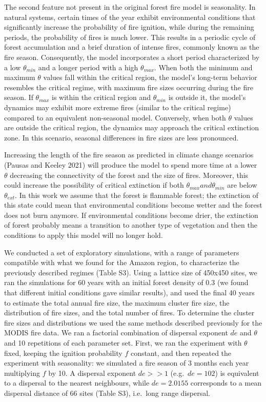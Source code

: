 \documentclass[
]{article}
\begin{document}
The second feature not present in the original forest fire model is
seasonality. In natural systems, certain times of the year exhibit
environmental conditions that significantly increase the probability of
fire ignition, while during the remaining periods, the probability of
fires is much lower. This results in a periodic cycle of forest
accumulation and a brief duration of intense fires, commonly known as
the fire season. Consequently, the model incorporates a short period
characterized by a low \(\theta_{min}\) and a longer period with a high
\(\theta_{max}\). When both the minimum and maximum \(\theta\) values
fall within the critical region, the model's long-term behavior
resembles the critical regime, with maximum fire sizes occurring during
the fire season. If \(\theta_{max}\) is within the critical region and
\(\theta_{min}\) is outside it, the model's dynamics may exhibit more
extreme fires (similar to the critical regime) compared to an equivalent
non-seasonal model. Conversely, when both \(\theta\) values are outside
the critical region, the dynamics may approach the critical extinction
zone. In this scenario, seasonal differences in fire sizes are less
pronounced.

Increasing the length of the fire season as predicted in climate change
scenarios (Pausas and Keeley 2021) will produce the model to spend more
time at a lower \(\theta\) decreasing the connectivity of the forest and
the size of fires. Moreover, this could increase the possibility of
critical extinction if both \(\theta_{max} and \theta_{min}\) are below
\(\theta_{ext}\). In this work we assume that the forest is flammable
forest; the extinction of this state could mean that environmental
conditions become wetter and the forest does not burn anymore. If
environmental conditions become drier, the extinction of forest probably
means a transition to another type of vegetation and then the conditions
to apply this model will no longer hold.

We conducted a set of exploratory simulations, with a range of
parameters compatible with what we found for the Amazon region, to
characterize the previously described regimes (Table S3). Using a
lattice size of 450x450 sites, we ran the simulations for 60 years with
an initial forest density of 0.3 (we found that different initial
conditions gave similar results), and used the final 40 years to
estimate the total annual fire size, the maximum cluster fire size, the
distribution of fire sizes, and the total number of fires. To determine
the cluster fire sizes and distributions we used the same methods
described previously for the MODIS fire data. We ran a factorial
combination of dispersal exponent \(de\) and \(\theta\) and 10
repetitions of each parameter set. First, we ran the experiment with
\(\theta\) fixed, keeping the ignition probability \(f\) constant, and
then repeated the experiment with seasonality: we simulated a fire
season of 3 months each year multiplying \(f\) by 10. A dispersal
exponent \(de>>1\) (e.g.~\(de=102\)) is equivalent to a dispersal to the
nearest neighbours, while \(de=2.0155\) corresponds to a mean dispersal
distance of 66 sites (Table S3), i.e.~long range dispersal.
\end{document}
